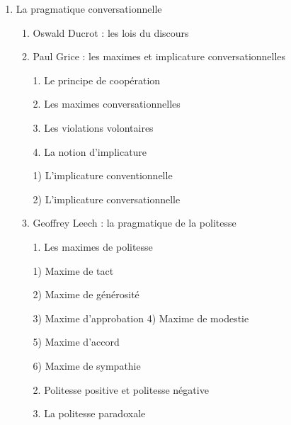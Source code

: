 \begin{keybox}
\begin{enumerate}[label=\arabic*.]
\begin{enumerate}[label=\textcircled{\scriptsize\arabic*}]
\item La classification des \textit{speech acts}\par 1. Les actes locutoires\par 2. Les actes illocutoires\par 3. Les actes perlocutoires\par 4. Différence entre actes illocutoires et perlocutoires
\item La performativité selon Derrida
\item La classification des actes illocutoires
\item La classification des verbes performatifs
\end{enumerate}
\item La pragmatique conversationnelle
\begin{enumerate}[label=\textcircled{\scriptsize\arabic*}]
\item Oswald Ducrot : les lois du discours
\item Paul Grice : les maximes et implicature conversationnelles
\par 1. Le principe de coopération\par 2. Les maximes conversationnelles\par 3. Les violations volontaires\par 4. La notion d’implicature\par\hspace*{1em}1) L’implicature conventionnelle\par\hspace*{1em}2) L’implicature conversationnelle
\item Geoffrey Leech : la pragmatique de la politesse\par 1. Les maximes de politesse\par\hspace*{1em}1) Maxime de tact\par\hspace*{1em}2) Maxime de générosité\par\hspace*{1em}3) Maxime d’approbation
\tcbbreak
{}
\hspace*{1em}4) Maxime de modestie\par\hspace*{1em}5) Maxime d’accord\par\hspace*{1em}6) Maxime de sympathie\par 2. Politesse positive et politesse négative\par 3. La politesse paradoxale

\end{enumerate}
\end{enumerate}
\end{keybox}
